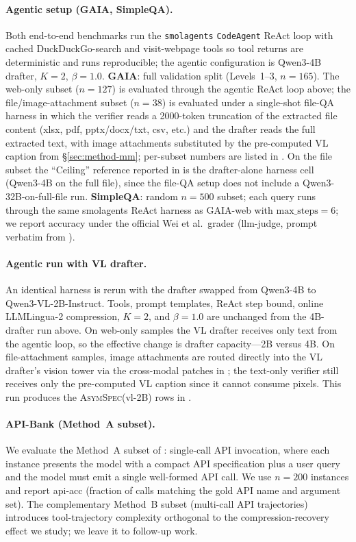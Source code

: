 \documentclass[11pt]{article}
\theoremstyle{plain}
\theoremstyle{definition}
\begin{document}
\paragraph{Agentic setup (GAIA, SimpleQA).}
Both end-to-end benchmarks run the \texttt{smolagents} \texttt{CodeAgent} ReAct loop with cached DuckDuckGo-search and visit-webpage tools so tool returns are deterministic and runs reproducible; the agentic configuration is Qwen3-4B drafter, $K{=}2$, $\beta{=}1.0$. \textbf{GAIA}: full validation split (Levels~1--3, $n{=}165$). The web-only subset ($n{=}127$) is evaluated through the agentic ReAct loop above; the file/image-attachment subset ($n{=}38$) is evaluated under a single-shot file-QA harness in which the verifier reads a 2000-token truncation of the extracted file content (xlsx, pdf, pptx/docx/txt, csv, etc.) and the drafter reads the full extracted text, with image attachments substituted by the pre-computed VL caption from \S\ref{sec:method-mm}; per-subset numbers are listed in . On the file subset the ``Ceiling'' reference reported in  is the drafter-alone harness cell (Qwen3-4B on the full file), since the file-QA setup does not include a Qwen3-32B-on-full-file run. \textbf{SimpleQA}: random $n{=}500$ subset; each query runs through the same smolagents ReAct harness as GAIA-web with $\text{max\_steps}{=}6$; we report accuracy under the official Wei et al.\ grader (llm-judge, prompt verbatim from \citet{wei2024simpleqa}).

\paragraph{Agentic run with VL drafter.}
An identical harness is rerun with the drafter swapped from Qwen3-4B to Qwen3-VL-2B-Instruct. Tools, prompt templates, ReAct step bound, online LLMLingua-2 compression, $K{=}2$, and $\beta{=}1.0$ are unchanged from the 4B-drafter run above. On web-only samples the VL drafter receives only text from the agentic loop, so the effective change is drafter capacity---2B versus 4B. On file-attachment samples, image attachments are routed directly into the VL drafter's vision tower via the cross-modal patches in ; the text-only verifier still receives only the pre-computed VL caption since it cannot consume pixels. This run produces the \textsc{AsymSpec}(vl-2B) rows in .

\paragraph{API-Bank (Method~A subset).}
We evaluate the Method~A subset of \citet{li2023apibank}: single-call API invocation, where each instance presents the model with a compact API specification plus a user query and the model must emit a single well-formed API call. We use $n{=}200$ instances and report api-acc (fraction of calls matching the gold API name and argument set). The complementary Method~B subset (multi-call API trajectories) introduces tool-trajectory complexity orthogonal to the compression-recovery effect we study; we leave it to follow-up work.
\end{document}
